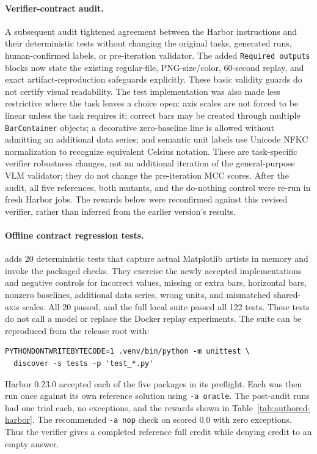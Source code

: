 \documentclass[11pt]{article}
\begin{document}
\paragraph{Verifier-contract audit.}
A subsequent audit tightened agreement between the Harbor instructions and
their deterministic tests without changing the original tasks, generated
runs, human-confirmed labels, or pre-iteration validator. The added
\texttt{Required outputs} blocks now state the existing regular-file,
PNG-size/color, 60-second replay, and exact artifact-reproduction safeguards
explicitly. These basic validity guards do not certify visual readability.
The test implementation was also made less restrictive where the task
leaves a choice open: axis scales are not forced to be linear unless the
task requires it; correct bars may be created through multiple
\texttt{BarContainer} objects; a decorative zero-baseline line is allowed
without admitting an additional data series; and semantic unit labels use
Unicode NFKC normalization to recognize equivalent Celsius notation.
These are task-specific verifier robustness changes, not an additional
iteration of the general-purpose VLM validator; they do not change the
pre-iteration MCC scores. After the audit, all five references, both
mutants, and the do-nothing control were re-run in fresh Harbor jobs.
The rewards below were reconfirmed against this revised verifier, rather
than inferred from the earlier version's results.

\paragraph{Offline contract regression tests.}
 adds 20 deterministic tests
that capture actual Matplotlib artists in memory and invoke the packaged
checks. They exercise the newly accepted implementations and negative
controls for incorrect values, missing or extra bars, horizontal bars,
nonzero baselines, additional data series, wrong units, and mismatched
shared-axis scales. All 20 passed, and the full local suite passed all
122 tests. These tests do not call a model or replace the Docker replay
experiments. The suite can be reproduced from the release root with:
\begin{verbatim}
PYTHONDONTWRITEBYTECODE=1 .venv/bin/python -m unittest \
  discover -s tests -p 'test_*.py'
\end{verbatim}

Harbor 0.23.0 accepted each of the five packages in its preflight.
Each was then run once against its own reference solution using
\texttt{-a oracle}. The post-audit runs had one trial each, no
exceptions, and the rewards shown in Table~\ref{tab:authored-harbor}.
The recommended \texttt{-a nop} check on
 scored $0.0$ with zero exceptions.
Thus the verifier gives a completed reference full credit while denying
credit to an empty answer.
\end{document}
